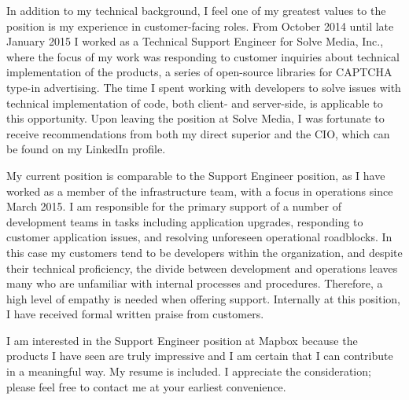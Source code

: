 \documentclass[11pt,a4paper,sans]{moderncv}        %
\begin{document}
In addition to my technical background, I feel one of my greatest values to the position is my experience in customer-facing roles. From October 2014 until late January 2015 I worked as a Technical Support Engineer for Solve Media, Inc., where the focus of my work was responding to customer inquiries about technical implementation of the products, a series of open-source libraries for CAPTCHA type-in advertising. The time I spent working with developers to solve issues with technical implementation of code, both client- and server-side, is applicable to this opportunity. Upon leaving the position at Solve Media, I was fortunate to receive recommendations from both my direct superior and the CIO, which can be found on my LinkedIn profile.

My current position is comparable to the Support Engineer position, as I have worked as a member of the infrastructure team, with a focus in operations since March 2015. I am responsible for the primary support of a number of development teams in tasks including application upgrades, responding to customer application issues, and resolving unforeseen operational roadblocks. In this case my customers tend to be developers within the organization, and despite their technical proficiency, the divide between development and operations leaves many who are unfamiliar with internal processes and procedures. Therefore, a high level of empathy is needed when offering support. Internally at this position, I have received formal written praise from customers.

I am interested in the Support Engineer position at Mapbox because the products I have seen are truly impressive and I am certain that I can contribute in a meaningful way. My resume is included. I appreciate the consideration; please feel free to contact me at your earliest convenience.

\makeletterclosing
\end{document}
